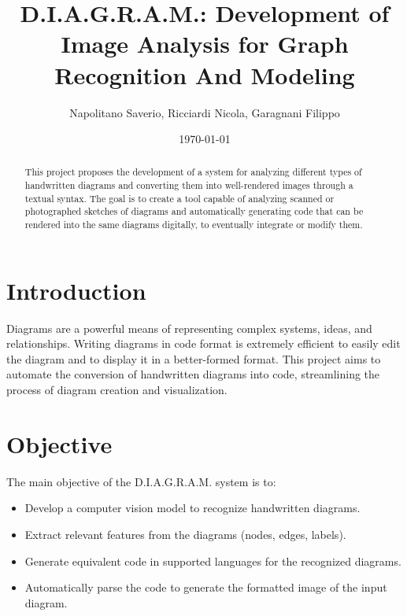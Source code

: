 \documentclass[a4paper,12pt]{article}
\title{D.I.A.G.R.A.M.: Development of Image Analysis for Graph Recognition And Modeling}
\author{Napolitano Saverio, Ricciardi Nicola, Garagnani Filippo}
\date{\today}
\begin{document}
\maketitle

\begin{abstract}
    This project proposes the development of a system for analyzing different types of handwritten diagrams and converting them into well-rendered images through a textual syntax. The goal is to create a tool capable of analyzing scanned or photographed sketches of diagrams and automatically generating code that can be rendered into the same diagrams digitally, to eventually integrate or modify them.
\end{abstract}

\section{Introduction}
    Diagrams are a powerful means of representing complex systems, ideas, and relationships. Writing diagrams in code format is extremely efficient to easily edit the diagram and to display it in a better-formed format. This project aims to automate the conversion of handwritten diagrams into code, streamlining the process of diagram creation and visualization.

\section{Objective}
    The main objective of the D.I.A.G.R.A.M. system is to:
    \begin{itemize}
        \item Develop a computer vision model to recognize handwritten diagrams.
        \item Extract relevant features from the diagrams (nodes, edges, labels).
        \item Generate equivalent code in supported languages for the recognized diagrams.
        \item Automatically parse the code to generate the formatted image of the input diagram.
    \end{itemize}
    
\end{document}
